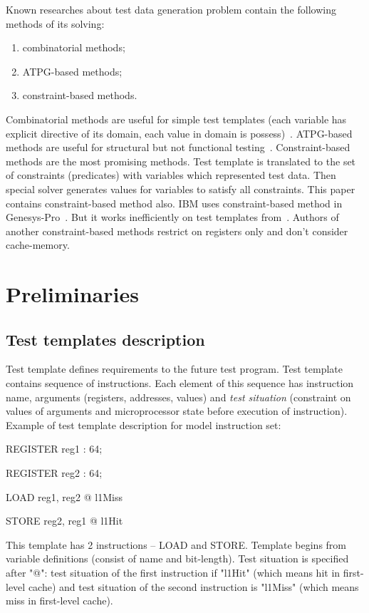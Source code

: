 \documentclass[times, 10pt,twocolumn]{article}
\begin{document}
Known researches about test data generation problem contain the
following methods of its solving:
\begin{enumerate}
\item combinatorial methods;
\item ATPG-based methods;
\item constraint-based methods.
\end{enumerate}

Combinatorial methods are useful for simple test templates (each
variable has explicit directive of its domain, each value in domain
is possess)~\cite{combinatorial}. ATPG-based methods are useful for
structural but not functional testing~\cite{ATPG}. Constraint-based
methods are the most promising methods. Test template is translated
to the set of constraints (predicates) with variables which
represented test data. Then special solver generates values for
variables to satisfy all constraints. This paper contains
constraint-based method also. IBM uses constraint-based method in
Genesys-Pro~\cite{GenesysPro}. But it works inefficiently on test
templates from~\cite{kamkin}. Authors of another constraint-based
methods restrict on registers only and don't consider cache-memory.

\section{Preliminaries}

\subsection{Test templates description}

Test template defines requirements to the future test program. Test
template contains sequence of instructions. Each element of this
sequence has instruction name, arguments (registers, addresses,
values) and \emph{test situation} (constraint on values of arguments and
microprocessor state before execution of instruction). Example of
test template description for model instruction set:

REGISTER reg1 : 64;

REGISTER reg2 : 64;

LOAD reg1, reg2 @ l1Miss

STORE reg2, reg1 @ l1Hit

This template has 2 instructions -- LOAD and STORE. Template begins
from variable definitions (consist of name and bit-length). Test
situation is specified after "@": test situation of the first
instruction if "l1Hit" (which means hit in first-level cache) and
test situation of the second instruction is "l1Miss" (which means
miss in first-level cache).
\end{document}

